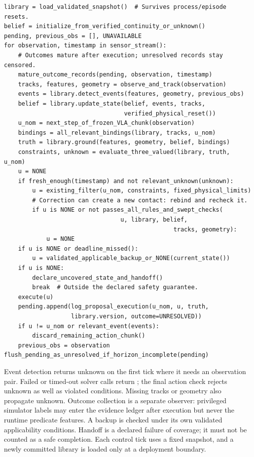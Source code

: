 \documentclass[10pt]{article}
\newcommand{\code}[1]{\texttt{\detokenize{#1}}}
\begin{document}
\begin{lstlisting}[caption={Algorithm 2. Runtime monitoring with a frozen library},basicstyle=\ttfamily\footnotesize]
library = load_validated_snapshot()  # Survives process/episode resets.
belief = initialize_from_verified_continuity_or_unknown()
pending, previous_obs = [], UNAVAILABLE
for observation, timestamp in sensor_stream():
    # Outcomes mature after execution; unresolved records stay censored.
    mature_outcome_records(pending, observation, timestamp)
    tracks, features, geometry = observe_and_track(observation)
    events = library.detect_events(features, geometry, previous_obs)
    belief = library.update_state(belief, events, tracks,
                                  verified_physical_reset())
    u_nom = next_step_of_frozen_VLA_chunk(observation)
    bindings = all_relevant_bindings(library, tracks, u_nom)
    truth = library.ground(features, geometry, belief, bindings)
    constraints, unknown = evaluate_three_valued(library, truth, u_nom)
    u = NONE
    if fresh_enough(timestamp) and not relevant_unknown(unknown):
        u = existing_filter(u_nom, constraints, fixed_physical_limits)
        # Correction can create a new contact: rebind and recheck it.
        if u is NONE or not passes_all_rules_and_swept_checks(
                                 u, library, belief,
                                                tracks, geometry):
            u = NONE
    if u is NONE or deadline_missed():
        u = validated_applicable_backup_or_NONE(current_state())
    if u is NONE:
        declare_uncovered_state_and_handoff()
        break  # Outside the declared safety guarantee.
    execute(u)
    pending.append(log_proposal_execution(u_nom, u, truth,
                   library.version, outcome=UNRESOLVED))
    if u != u_nom or relevant_event(events):
        discard_remaining_action_chunk()
    previous_obs = observation
flush_pending_as_unresolved_if_horizon_incomplete(pending)
\end{lstlisting}

Event detection returns unknown on the first tick where it needs an observation pair. Failed or timed-out solver calls return \code{NONE}; the final action check rejects unknown as well as violated conditions. Missing tracks or geometry also propagate unknown. Outcome collection is a separate observer: privileged simulator labels may enter the evidence ledger after execution but never the runtime predicate features. A backup is checked under its own validated applicability conditions. Handoff is a declared failure of coverage; it must not be counted as a safe completion. Each control tick uses a fixed snapshot, and a newly committed library is loaded only at a deployment boundary.
\end{document}
